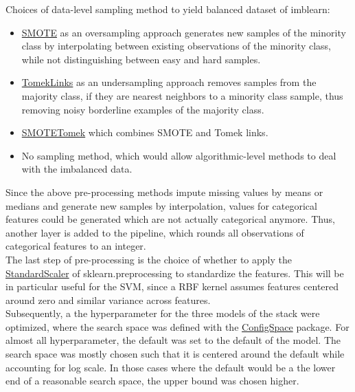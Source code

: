 \documentclass[11pt]{article}
\begin{document}
Choices of data-level sampling method to yield balanced dataset of imblearn:
\begin{itemize}
\item \href{https://imbalanced-learn.org/stable/references/generated/imblearn.over_sampling.SMOTE.html}{SMOTE} as an oversampling approach generates new samples of the minority class by interpolating between existing observations of the minority class, while not distinguishing between easy and hard samples. 
\item \href{https://imbalanced-learn.org/stable/references/generated/imblearn.under_sampling.TomekLinks.html}{TomekLinks} as an undersampling approach removes samples from the majority class, if they are nearest neighbors to a minority class sample, thus removing noisy borderline examples of the majority class. 
\item \href{https://imbalanced-learn.org/stable/references/generated/imblearn.combine.SMOTETomek.html}{SMOTETomek} which combines SMOTE and Tomek links.
\item No sampling method, which would allow algorithmic-level methods to deal with the imbalanced data. 
\end{itemize}

Since the above pre-processing methods impute missing values by means or medians and generate new samples by interpolation, values for categorical features could be generated which are not actually categorical anymore. Thus, another layer is added to the pipeline, which rounds all observations of categorical features to an integer. \\ 

The last step of pre-processing is  the choice of whether to apply the \href{https://scikit-learn.org/stable/modules/generated/sklearn.preprocessing.StandardScaler.html}{StandardScaler} of sklearn.preprocessing to standardize the features. This will be in particular useful for the SVM, since a RBF kernel assumes features centered around zero and similar variance across features. \\

Subsequently, a the hyperparameter for the three models of the stack were optimized, where the search space was defined with the \href{https://automl.github.io/ConfigSpace/main/}{ConfigSpace} package. For almost all hyperparameter, the default was set to the default of the model. The search space was mostly chosen such that it is centered around the default while accounting for log scale. In those cases where the default would be a the lower end of a reasonable search space, the upper bound was chosen higher. \\
\end{document}
